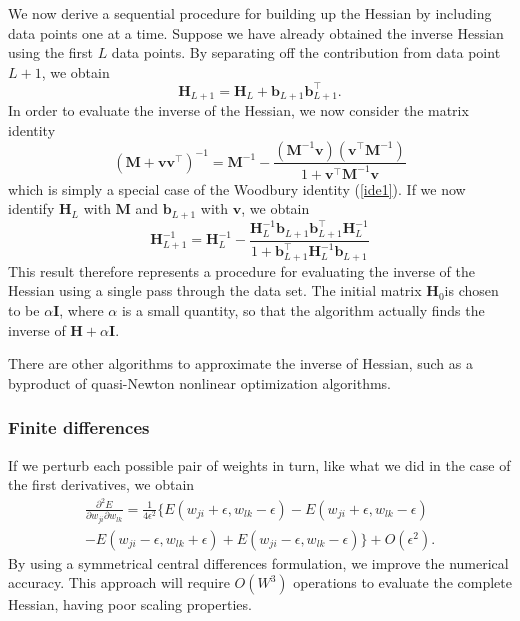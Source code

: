 \documentclass[a4paper]{book}
\renewcommand{\bf}{\mathbf}
\begin{document}
We now derive a sequential procedure for building up the Hessian by including data points one at a time. Suppose we have already obtained the inverse Hessian using the first $L$ data points. By separating off the contribution from data point $L+1$, we obtain
\begin{equation}
	\bf{H}_{L+1} = \bf{H}_L + \bf{b}_{L+1} \bf{b}_{L+1}^{\intercal}.
\end{equation}
In order to evaluate the inverse of the Hessian, we now consider the matrix identity
\begin{equation}
	(\bf{M}+\bf{vv}^{\intercal})^{-1} = \bf{M}^{-1} - \frac{(\bf{M}^{-1}\bf{v})(\bf{v}^{\intercal}\bf{M}^{-1})}{1+\bf{v}^{\intercal} \bf{M}^{-1} \bf{v}}
\end{equation}
which is simply a special case of the Woodbury identity (\ref{ide1}). If we now identify $\bf{H}_L$ with $\bf{M}$ and $\bf{b}_{L+1}$ with $\bf{v}$, we obtain
\begin{equation}
	\bf{H}_{L+1}^{-1} = \bf{H}_L^{-1} - \frac{\bf{H}_L^{-1}\bf{b}_{L+1}\bf{b}_{L+1}^{\intercal} \bf{H}_L^{-1}}{1+\bf{b}_{L+1}^{\intercal}\bf{H}_L^{-1}\bf{b}_{L+1}}
\end{equation}
This result therefore represents a procedure for evaluating the inverse of the Hessian using a single pass through the data set. The initial matrix $\bf{H}_0 $is chosen to be $\alpha \bf{I}$, where $\alpha$ is a small quantity, so that the algorithm actually finds the inverse of $\bf{H}+\alpha \bf{I}$.

There are other algorithms to approximate the inverse of Hessian, such as a byproduct of quasi-Newton nonlinear optimization algorithms.
\subsubsection{Finite differences}
If we perturb each possible pair of weights in turn, like what we did in the case of the first derivatives, we obtain
\begin{align}
	\frac{\partial^2 E}{\partial w_{ji} \partial w_{lk}} = \frac{1}{4 \epsilon^2} \{ E(w_{ji}+\epsilon,w_{lk}-\epsilon)-E(w_{ji}+\epsilon,w_{lk}-\epsilon)\\-E(w_{ji}-\epsilon,w_{lk}+\epsilon)+E(w_{ji}-\epsilon,w_{lk}-\epsilon) \} +O(\epsilon
	^2).
\end{align}
By using a symmetrical central differences formulation, we improve the numerical accuracy. This approach will require $O(W^3)$ operations to evaluate the complete Hessian, having poor scaling properties.
\end{document}
